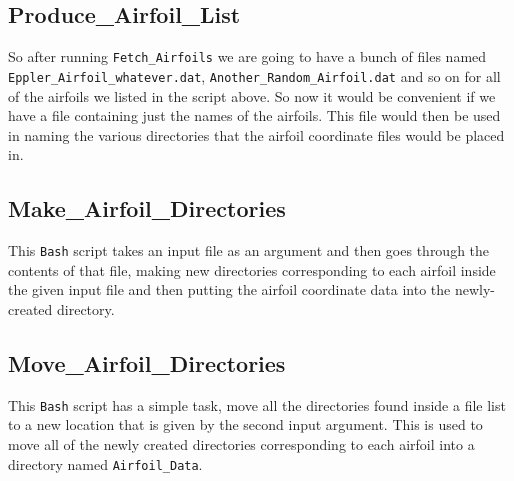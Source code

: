 \subsection{Produce\_Airfoil\_List}

So after running \texttt{Fetch\_Airfoils} we are going to have a bunch of files named \texttt{Eppler\_Airfoil\_whatever.dat}, \texttt{Another\_Random\_Airfoil.dat} and so on for all of the airfoils we listed in the script above. So now it would be convenient if we have a file containing just the names of the airfoils. This file would then be used in naming the various directories that the airfoil coordinate files would be placed in.


\subsection{Make\_Airfoil\_Directories}

This \texttt{Bash} script takes an input file as an argument and then goes through the contents of that file, making new directories corresponding to each airfoil inside the given input file and then putting the airfoil coordinate data into the newly-created directory.


\subsection{Move\_Airfoil\_Directories}

This \texttt{Bash} script has a simple task, move all the directories found inside a file list to a new location that is given by the second input argument. This is used to move all of the newly created directories corresponding to each airfoil into a directory named \texttt{Airfoil\_Data}. 



